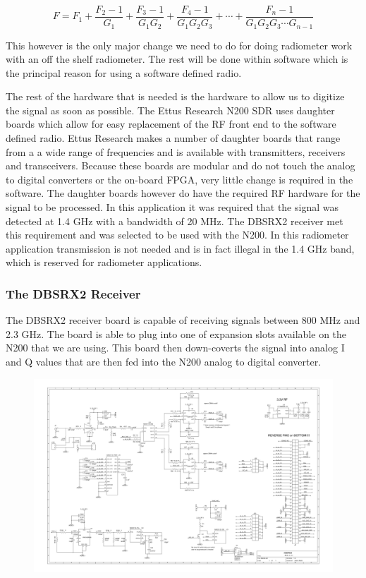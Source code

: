 \begin{equation}\label{noise_factor}
F=F_1+\frac{F_2-1}{G_1}+\frac{F_3-1}{G_1 G_2}+\frac{F_4-1}{G_1 G_2 G_3}+\cdots +\frac{F_n-1}{G_1 G_2 G_3 \cdots G_{n-1}}
\end{equation}

This however is the only major change we need to do for doing radiometer work with an off the shelf radiometer.  The rest will be done within software which is the principal reason for using a software defined radio.  

The rest of the hardware that is needed is the hardware to allow us to digitize the signal as soon as possible.  The Ettus Research N200 SDR uses daughter boards which allow for easy replacement of the RF front end to the software defined radio.  Ettus Research makes a number of daughter boards that range from a a wide range of frequencies and is available with transmitters, receivers and transceivers.  Because these boards are modular and do not touch the analog to digital converters or the on-board FPGA, very little change is required in the software.  The daughter boards however do have the required RF hardware for the signal to be processed.  In this application it was required that the signal was detected at 1.4 GHz with a bandwidth of 20 MHz.  The DBSRX2 receiver met this requirement and was selected to be used with the N200.  In this radiometer application transmission is not needed and is in fact illegal in the 1.4 GHz band, which is reserved for radiometer applications.

\subsubsection{The DBSRX2 Receiver}
The DBSRX2 receiver board is capable of receiving signals between 800 MHz and 2.3 GHz.  The board is able to plug into one of expansion slots available on the N200 that we are using.  This board then down-coverts the signal into analog I and Q values that are then fed into the N200 analog to digital converter.

{\begin{figure}[h!tb] 
\centering
\includegraphics{Images/dbsrx2}
\label{dbsrx2}
\end{figure}
}

